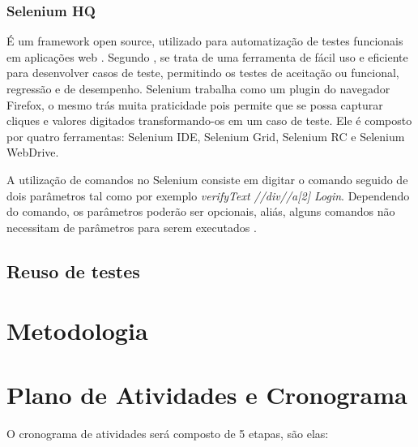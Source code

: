\documentclass[12pt]{article}
\begin{document}
	\subsubsection{Selenium HQ}
	É um framework open source, utilizado para automatização de testes funcionais em aplicações web \cite{chiavegatto1desenvolvimento}. Segundo \citeauthor{pereiraestudoselenium} \cite{pereiraestudoselenium}, se trata de uma ferramenta de fácil uso e eficiente para desenvolver casos de teste, permitindo os testes de aceitação ou funcional, regressão e de desempenho. 
	Selenium trabalha como um plugin do navegador Firefox, o mesmo trás muita praticidade pois permite que se possa capturar cliques e valores digitados transformando-os em um caso de teste. Ele é composto por quatro ferramentas: Selenium IDE, Selenium Grid, Selenium RC e Selenium WebDrive. 

	A  utilização  de  comandos  no  Selenium  consiste  em  digitar  o  comando  seguido  de  dois parâmetros  tal  como  por  exemplo \emph{verifyText //div//a[2] Login}. Dependendo  do  comando,  os parâmetros poderão ser opcionais, aliás, alguns comandos não necessitam de parâmetros para serem executados \cite{sixpenceautomatizaccao}.

	\subsection{Reuso de testes}

	\section{Metodologia}


	\section{Plano de Atividades e Cronograma}

	O cronograma de atividades será composto de 5 etapas, são elas:
	
\end{document}

